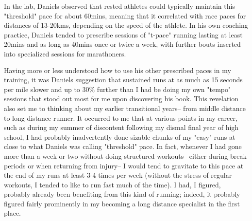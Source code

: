 In the lab, Daniels observed that rested athletes could typically maintain this "threshold" pace for about 60mins, meaning that it correlated with race paces for distances of 13-20kms, depending on the speed of the athlete. In his own coaching practice, Daniels tended to prescribe sessions of "t-pace" running lasting at least 20mins and as long as 40mins once or twice a week, with further bouts inserted into specialized sessions for marathoners.

Having more or less understood how to use his other prescribed paces in my training, it was Daniels suggestion that sustained runs at as much as 15 seconds per mile slower and up to 30\% further than I had be doing my own "tempo" sessions that stood out most for me upon discovering his book. This revelation also set me to thinking about my earlier transitional years-- from middle distance to long distance runner. It occurred to me that at various points in my career, such as during my summer of discontent following my dismal final year of high school, I had probably inadvertently done sizable chunks of my "easy" runs at close to what Daniels was calling "threshold" pace. In fact, whenever I had gone more than a week or two without doing structured workouts-- either during break periods or when returning from injury-- I would tend to gravitate to this pace at the end of my runs at least 3-4 times per week (without the stress of regular workouts, I tended to like to run fast much of the time). I had, I figured, probably already been benefiting from this kind of running; indeed, it probably figured fairly prominently in my becoming a long distance specialist in the first place.


